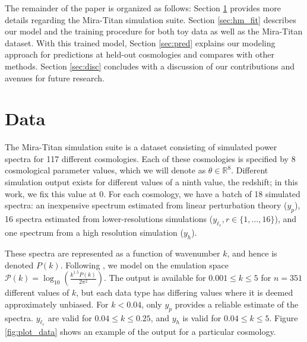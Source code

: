 \documentclass[11pt]{article}
\begin{document}
The remainder of the paper is organized as follows: Section \ref{sec:data} provides more details regarding the Mira-Titan simulation suite. Section \ref{sec:hm_fit} describes our model and the training procedure for both toy data as well as the Mira-Titan dataset. With this trained model, Section \ref{sec:pred} explains our modeling approach for predictions at held-out cosmologies and compares with other methods. Section \ref{sec:disc} concludes with a discussion of our contributions and avenues for future research.

\section{Data}
\label{sec:data}

The Mira-Titan simulation suite is a dataset consisting of simulated power spectra for 117 different cosmologies. Each of these cosmologies is specified by 8 cosmological parameter values, which we will denote as $\theta \in \mathbb{R}^8$. Different simulation output exists for different values of a ninth value, the redshift; in this work, we fix this value at 0. For each cosmology, we have a batch of 18 simulated spectra: an inexpensive spectrum estimated from linear perturbation theory ($y_p$), 16 spectra estimated from lower-resolutions simulations ($y_{\ell_r}, r \in \{1,\dots,16\}$), and one spectrum from a high resolution simulation ($y_h$). 

These spectra are represented as a function of wavenumber $k$, and hence is denoted $P(k)$. Following \cite{moran2023mira}, we model on the emulation space $\mathcal{P}(k)=\log_{10}\left(\frac{k^{1.5}P(k)}{2\pi^2}\right)$. The output is available for $0.001 \leq k \leq 5$ for $n=351$ different values of $k$, but each data type has differing values where it is deemed approximately unbiased. For $k<0.04$, only $y_p$ provides a reliable estimate of the spectra. $y_{\ell_r}$ are valid for $0.04 \leq k \leq 0.25$, and $y_h$ is valid for $0.04 \leq k \leq 5$. Figure \ref{fig:plot_data} shows an example of the output for a particular cosmology.
\end{document}
